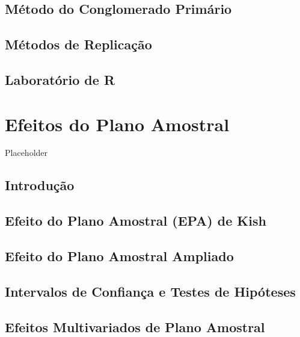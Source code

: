 \documentclass[
]{book}
\begin{document}
\hypertarget{muxe9todo-do-conglomerado-primuxe1rio}{%
\section{Método do Conglomerado Primário}\label{muxe9todo-do-conglomerado-primuxe1rio}}

\hypertarget{muxe9todos-de-replicauxe7uxe3o}{%
\section{Métodos de Replicação}\label{muxe9todos-de-replicauxe7uxe3o}}

\hypertarget{laboratuxf3rio-de-r}{%
\section{Laboratório de R}\label{laboratuxf3rio-de-r}}

\hypertarget{epa}{%
\chapter{Efeitos do Plano Amostral}\label{epa}}

Placeholder

\hypertarget{introduuxe7uxe3o}{%
\section{Introdução}\label{introduuxe7uxe3o}}

\hypertarget{efeito-do-plano-amostral-epa-de-kish}{%
\section{Efeito do Plano Amostral (EPA) de Kish}\label{efeito-do-plano-amostral-epa-de-kish}}

\hypertarget{efeito-do-plano-amostral-ampliado}{%
\section{Efeito do Plano Amostral Ampliado}\label{efeito-do-plano-amostral-ampliado}}

\hypertarget{icth}{%
\section{Intervalos de Confiança e Testes de Hipóteses}\label{icth}}

\hypertarget{efeitos-multivariados-de-plano-amostral}{%
\section{Efeitos Multivariados de Plano Amostral}\label{efeitos-multivariados-de-plano-amostral}}
\end{document}
